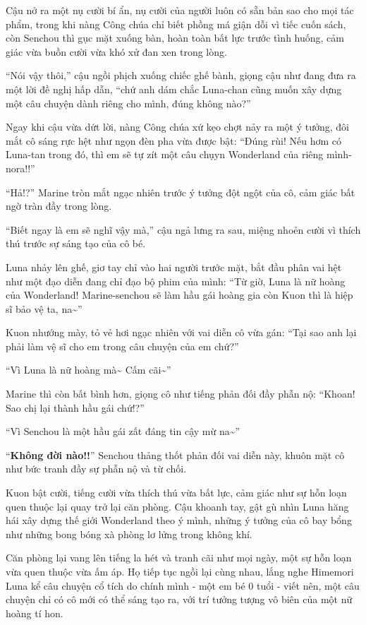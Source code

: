 \documentclass[../main.tex]{subfiles}
\begin{document}
Cậu nở ra một nụ cười bí ẩn, nụ cười của người luôn có sẵn bản sao cho mọi tác phẩm, trong khi nàng Công chúa chỉ biết phồng má giận dỗi vì tiếc cuốn sách, còn Senchou thì gục mặt xuống bàn, hoàn toàn bất lực trước tình huống, cảm giác vừa buồn cười vừa khó xử đan xen trong lòng.

``Nói vậy thôi,'' cậu ngồi phịch xuống chiếc ghế bành, giọng cậu như đang đưa ra một lời đề nghị hấp dẫn, ``chứ anh dám chắc Luna-chan cũng muốn xây dựng một câu chuyện dành riêng cho mình, đúng không nào?''

Ngay khi cậu vừa dứt lời, nàng Công chúa xứ kẹo chợt nảy ra một ý tưởng, đôi mắt cô sáng rực hệt như ngọn đèn pha vừa được bật: ``Đúng rùi! Nếu hơm có Luna-tan trong đó, thì em sẽ tự zít một câu chụyn Wonderland của riêng mình-nora!!''

``Hả!?'' Marine tròn mắt ngạc nhiên trước ý tưởng đột ngột của cô, cảm giác bất ngờ tràn đầy trong lòng.

``Biết ngay là em sẽ nghĩ vậy mà,'' cậu ngả lưng ra sau, miệng nhoẻn cười vì thích thú trước sự sáng tạo của cô bé.

Luna nhảy lên ghế, giơ tay chỉ vào hai người trước mặt, bắt đầu phân vai hệt như một đạo diễn đang chỉ đạo bộ phim của mình: ``Từ giờ, Luna là nữ hoàng của Wonderland! Marine-senchou sẽ làm hầu gái hoàng gia còn Kuon thì là hiệp sĩ bảo vệ ta, na\~{}''

Kuon nhướng mày, tỏ vẻ hơi ngạc nhiên với vai diễn cô vừa gán: ``Tại sao anh lại phải làm vệ sĩ cho em trong câu chuyện của em chứ?''

``Vì Luna là nữ hoàng mà\~{} Cấm cãi\~{}''

Marine thì còn bất bình hơn, giọng cô như tiếng phản đối đầy phẫn nộ: ``Khoan! Sao chị lại thành hầu gái chứ!?''

``Vì Senchou là một hầu gái zất đáng tin cậy mừ na\~{}''

``\textbf{Không đời nào!!}'' Senchou thảng thốt phản đối vai diễn này, khuôn mặt cô như bức tranh đầy sự phẫn nộ và từ chối.

Kuon bật cười, tiếng cười vừa thích thú vừa bất lực, cảm giác như sự hỗn loạn quen thuộc lại quay trở lại căn phòng. Cậu khoanh tay, gật gù nhìn Luna hăng hái xây dựng thế giới Wonderland theo ý mình, những ý tưởng của cô bay bổng như những bong bóng xà phòng lơ lửng trong không khí.

Căn phòng lại vang lên tiếng la hét và tranh cãi như mọi ngày, một sự hỗn loạn vừa quen thuộc vừa ấm áp. Họ tiếp tục ngồi lại cùng nhau, lắng nghe Himemori Luna kể câu chuyện cổ tích do chính mình - một em bé 0 tuổi - viết nên, một câu chuyện chỉ có cô mới có thể sáng tạo ra, với trí tưởng tượng vô biên của một nữ hoàng tí hon.
\end{document}
